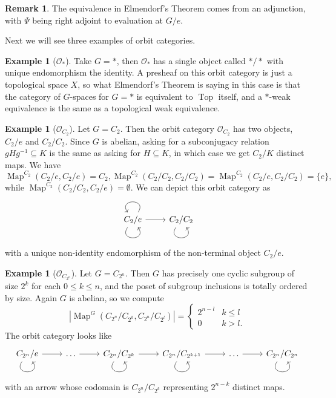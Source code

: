 \documentclass{amsart}
\theoremstyle{definition}
\newtheorem{example}[thm]{Example}
\newtheorem{remark}[thm]{Remark}
\numberwithin{thm}{section}
\def\O{\mathscr{O}}
\def\Map{\operatorname{Map}}
\def\Top{\operatorname{Top}}
\begin{document}
\begin{remark}
    The equivalence in Elmendorf's Theorem comes from an adjunction, with $\Psi$ being right adjoint to evaluation at $G/e$.
\end{remark}

Next we will see three examples of orbit categories. 

\begin{example}[$\O_*$]
    Take $G = *$, then $\O_*$ has a single object called $*/*$ with unique endomorphism the identity. A presheaf on this orbit category is just a topological space $X$, so what Elmendorf's Theorem is saying in this case is that the category of $G$-spaces for $G = *$ is equivalent to $\Top$ itself, and a $*$-weak equivalence is the same as a topological weak equivalence.
\end{example}

\begin{example}[$\O_{C_2}$] Let $G = C_2$. Then the orbit category $\O_{C_2}$ has two objects, $C_2/e$ and $C_2/C_2$. Since $G$ is abelian, asking for a subconjugacy relation $gHg^{-1} \subseteq K$ is the same as asking for $H \subseteq K$, in which case we get $C_2/K$ distinct maps. We have 
    \[\Map^{C_2}(C_2/e, C_2/e) = C_2, \Map^{C_2}(C_2/C_2, C_2/C_2) = \Map^{C_2}(C_2/e, C_2/C_2) = \{e\},\]
    while $\Map^{C_2}(C_2/C_2, C_2/e) = \emptyset$. We can depict this orbit category as 
    \[\begin{tikzcd}
        C_2/e \arrow[r] \arrow[loop, distance=2em, in=305, out=235] \arrow[loop, distance=2em, in=125, out=55] & C_2/C_2 \arrow[loop, distance=2em, in=305, out=235]
        \end{tikzcd}\]
    with a unique non-identity endomorphism of the non-terminal object $C_2/e$.
\end{example}

\begin{example}[$\O_{C_{2^n}}$]\label{ex: orbit of C2n}
    Let $G = C_{2^n}$. Then $G$ has precisely one cyclic subgroup of size $2^k$ for each $0 \leq k \leq n$, and the poset of subgroup inclusions is totally ordered by size. Again $G$ is abelian, so we compute 
    \[|\Map^G(C_{2^n}/C_{2^k}, C_{2^n}/C_{2^l})| = \begin{cases} 2^{n-l} & k \leq l \\ 0 & k > l. \end{cases}\] 
    The orbit category looks like
    \[\begin{tikzcd}
    C_{2^n}/e \arrow[r] \arrow[loop, distance=2em, in=305, out=235] & \ldots \arrow[r] & C_{2^n}/C_{2^k} \arrow[r] \arrow[loop, distance=2em, in=305, out=235] & C_{2^n}/C_{2^{k+1}} \arrow[loop, distance=2em, in=305, out=235] \arrow[r] & \ldots \arrow[r] & C_{2^n}/C_{2^n} \arrow[loop, distance=2em, in=305, out=235]
    \end{tikzcd}\]
    with an arrow whose codomain is $C_{2^n}/C_{2^k}$ representing $2^{n-k}$ distinct maps. 
\end{example}
\end{document}
